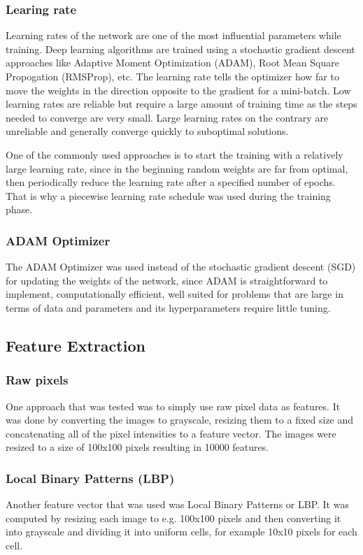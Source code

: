 \documentclass[doc/report.tex]{subfiles}
\begin{document}
\subsubsection{Learing rate}
Learning rates of the network are one of the most influential parameters while training. Deep learning algorithms are trained using a stochastic gradient descent approaches like Adaptive Moment Optimization (ADAM), Root Mean Square Propogation (RMSProp), etc. The learning rate tells the optimizer how far to move the weights in the direction opposite to the gradient for a mini-batch. Low learning rates are reliable but require a large amount of training time as the steps needed to converge are very small. Large learning rates on the contrary are unreliable and generally converge quickly to suboptimal solutions.

One of the commonly used approaches is to start the training with a relatively large learning rate, since in the beginning random weights are far from optimal, then periodically reduce the learning rate after a specified number of epochs. That is why a piecewise learning rate schedule was used during the training phase.

\subsubsection{ADAM Optimizer}
The ADAM Optimizer was used instead of the stochastic gradient descent (SGD) for updating the weights of the network, since ADAM is straightforward to implement, computationally efficient, well suited for problems that are large in terms of data and parameters and its hyperparameters require little tuning.
\subsection{Feature Extraction}

\subsubsection{Raw pixels}
One approach that was tested was to simply use raw pixel data as features. It
was done by converting the images to grayscale, resizing them to a fixed size
and concatenating all of the pixel intensities to a feature vector. The images
were resized to a size of 100x100 pixels resulting in 10000 features.

\subsubsection{Local Binary Patterns (LBP)}
Another feature vector that was used was Local Binary Patterns or LBP. It was
computed by resizing each image to e.g. 100x100 pixels and then converting it
into grayscale and dividing it into uniform cells, for example 10x10 pixels for
each cell.
\end{document}
